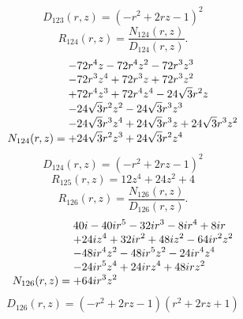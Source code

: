 \documentclass[11pt,a4paper]{article}
\begin{document}
\begin{equation}
D_{123}(r,z)=\left(- r^{2} + 2 r z - 1\right)^{2}
\label{eq:cat-denominator-123}
\end{equation}
\begin{equation}
R_{124}(r,z)=\frac{N_{124}(r,z)}{D_{124}(r,z)}.
\label{eq:cat-rational-124}
\end{equation}
\begin{equation}
N_{124}(r,z)=\shortstack[l]{$\displaystyle  - 72 r^{4} z - 72 r^{4} z^{2} - 72 r^{3} z^{3}$\\
$\displaystyle  - 72 r^{3} z^{4} + 72 r^{3} z + 72 r^{3} z^{2}$\\
$\displaystyle  + 72 r^{4} z^{3} + 72 r^{4} z^{4} - 24 \sqrt{3} r^{2} z$\\
$\displaystyle  - 24 \sqrt{3} r^{2} z^{2} - 24 \sqrt{3} r^{3} z^{3}$\\
$\displaystyle  - 24 \sqrt{3} r^{3} z^{4} + 24 \sqrt{3} r^{3} z + 24 \sqrt{3} r^{3} z^{2}$\\
$\displaystyle  + 24 \sqrt{3} r^{2} z^{3} + 24 \sqrt{3} r^{2} z^{4}$}
\label{eq:cat-numerator-124}
\end{equation}
\begin{equation}
D_{124}(r,z)=\left(- r^{2} + 2 r z - 1\right)^{2}
\label{eq:cat-denominator-124}
\end{equation}
\begin{equation}
R_{125}(r,z)=12 z^{4} + 24 z^{2} + 4
\label{eq:cat-rational-125}
\end{equation}
\begin{equation}
R_{126}(r,z)=\frac{N_{126}(r,z)}{D_{126}(r,z)}.
\label{eq:cat-rational-126}
\end{equation}
\begin{equation}
N_{126}(r,z)=\shortstack[l]{$\displaystyle 40 i - 40 i r^{5} - 32 i r^{3} - 8 i r^{4} + 8 i r$\\
$\displaystyle  + 24 i z^{4} + 32 i r^{2} + 48 i z^{2} - 64 i r^{2} z^{2}$\\
$\displaystyle  - 48 i r^{4} z^{2} - 48 i r^{5} z^{2} - 24 i r^{4} z^{4}$\\
$\displaystyle  - 24 i r^{5} z^{4} + 24 i r z^{4} + 48 i r z^{2}$\\
$\displaystyle  + 64 i r^{3} z^{2}$}
\label{eq:cat-numerator-126}
\end{equation}
\begin{equation}
D_{126}(r,z)=\left(- r^{2} + 2 r z - 1\right) \left(r^{2} + 2 r z + 1\right)
\label{eq:cat-denominator-126}
\end{equation}
\end{document}
